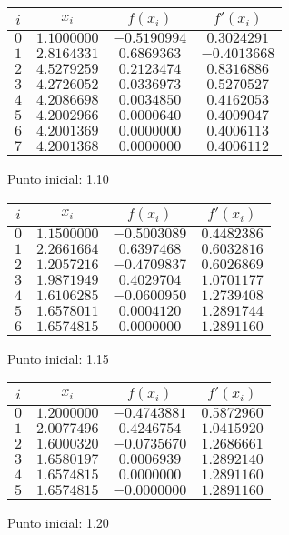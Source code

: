 \begin{figure}[H]
	\centering
	\caption{Punto inicial: 1.10}
	\begin{tabular}{|c|c|c|c|} \hline
		$i$ & $x_{i}$ & $f(x_{i})$ & $f'(x_{i})$ \\ \hline
		$0$ & $1.1000000$ & $-0.5190994$ & $0.3024291$ \\ \hline
		$1$ & $2.8164331$ & $0.6869363$ & $-0.4013668$ \\ \hline
		$2$ & $4.5279259$ & $0.2123474$ & $0.8316886$ \\ \hline
		$3$ & $4.2726052$ & $0.0336973$ & $0.5270527$ \\ \hline
		$4$ & $4.2086698$ & $0.0034850$ & $0.4162053$ \\ \hline
		$5$ & $4.2002966$ & $0.0000640$ & $0.4009047$ \\ \hline
		$6$ & $4.2001369$ & $0.0000000$ & $0.4006113$ \\ \hline
		$7$ & $4.2001368$ & $0.0000000$ & $0.4006112$ \\ \hline
	\end{tabular}
\end{figure}
\begin{figure}[H]
	\centering
	\caption{Punto inicial: 1.15}
	\begin{tabular}{|c|c|c|c|} \hline
		$i$ & $x_{i}$ & $f(x_{i})$ & $f'(x_{i})$ \\ \hline
		$0$ & $1.1500000$ & $-0.5003089$ & $0.4482386$ \\ \hline
		$1$ & $2.2661664$ & $0.6397468$ & $0.6032816$ \\ \hline
		$2$ & $1.2057216$ & $-0.4709837$ & $0.6026869$ \\ \hline
		$3$ & $1.9871949$ & $0.4029704$ & $1.0701177$ \\ \hline
		$4$ & $1.6106285$ & $-0.0600950$ & $1.2739408$ \\ \hline
		$5$ & $1.6578011$ & $0.0004120$ & $1.2891744$ \\ \hline
		$6$ & $1.6574815$ & $0.0000000$ & $1.2891160$ \\ \hline
	\end{tabular}
\end{figure}
\begin{figure}[H]
	\centering
	\caption{Punto inicial: 1.20}
	\begin{tabular}{|c|c|c|c|} \hline
		$i$ & $x_{i}$ & $f(x_{i})$ & $f'(x_{i})$ \\ \hline
		$0$ & $1.2000000$ & $-0.4743881$ & $0.5872960$ \\ \hline
		$1$ & $2.0077496$ & $0.4246754$ & $1.0415920$ \\ \hline
		$2$ & $1.6000320$ & $-0.0735670$ & $1.2686661$ \\ \hline
		$3$ & $1.6580197$ & $0.0006939$ & $1.2892140$ \\ \hline
		$4$ & $1.6574815$ & $0.0000000$ & $1.2891160$ \\ \hline
		$5$ & $1.6574815$ & $-0.0000000$ & $1.2891160$ \\ \hline
	\end{tabular}
\end{figure}

